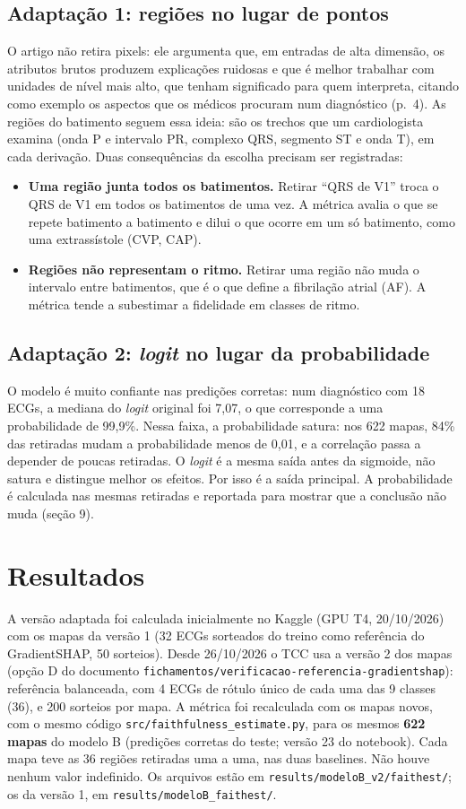 \documentclass[11pt,a4paper]{article}
\begin{document}
\subsection{Adaptação 1: regiões no lugar de pontos}
O artigo não retira pixels: ele argumenta que, em entradas de alta dimensão, os atributos brutos produzem explicações ruidosas e que é melhor trabalhar com unidades de nível mais alto, que tenham significado para quem interpreta, citando como exemplo os aspectos que os médicos procuram num diagnóstico (p.~4). As regiões do batimento seguem essa ideia: são os trechos que um cardiologista examina (onda P e intervalo PR, complexo QRS, segmento ST e onda T), em cada derivação. Duas consequências da escolha precisam ser registradas:
\begin{itemize}
\item \textbf{Uma região junta todos os batimentos.} Retirar “QRS de V1” troca o QRS de V1 em todos os batimentos de uma vez. A métrica avalia o que se repete batimento a batimento e dilui o que ocorre em um só batimento, como uma extrassístole (CVP, CAP).
\item \textbf{Regiões não representam o ritmo.} Retirar uma região não muda o intervalo entre batimentos, que é o que define a fibrilação atrial (AF). A métrica tende a subestimar a fidelidade em classes de ritmo.
\end{itemize}

\subsection{Adaptação 2: \textit{logit} no lugar da probabilidade}
O modelo é muito confiante nas predições corretas: num diagnóstico com 18 ECGs, a mediana do \textit{logit} original foi 7,07, o que corresponde a uma probabilidade de 99,9\%. Nessa faixa, a probabilidade satura: nos 622 mapas, 84\% das retiradas mudam a probabilidade menos de 0,01, e a correlação passa a depender de poucas retiradas. O \textit{logit} é a mesma saída antes da sigmoide, não satura e distingue melhor os efeitos. Por isso é a saída principal. A probabilidade é calculada nas mesmas retiradas e reportada para mostrar que a conclusão não muda (seção 9).

\section{Resultados}
A versão adaptada foi calculada inicialmente no Kaggle (GPU T4, 20/10/2026) com os mapas da versão 1 (32 ECGs sorteados do treino como referência do GradientSHAP, 50 sorteios). Desde 26/10/2026 o TCC usa a versão 2 dos mapas (opção D do documento \texttt{fichamentos/verificacao-referencia-gradientshap}): referência balanceada, com 4 ECGs de rótulo único de cada uma das 9 classes (36), e 200 sorteios por mapa. A métrica foi recalculada com os mapas novos, com o mesmo código \texttt{src/faithfulness\_estimate.py}, para os mesmos \textbf{622 mapas} do modelo B (predições corretas do teste; versão 23 do notebook). Cada mapa teve as 36 regiões retiradas uma a uma, nas duas baselines. Não houve nenhum valor indefinido. Os arquivos estão em \texttt{results/modeloB\_v2/faithest/}; os da versão 1, em \texttt{results/modeloB\_faithest/}.
\end{document}
